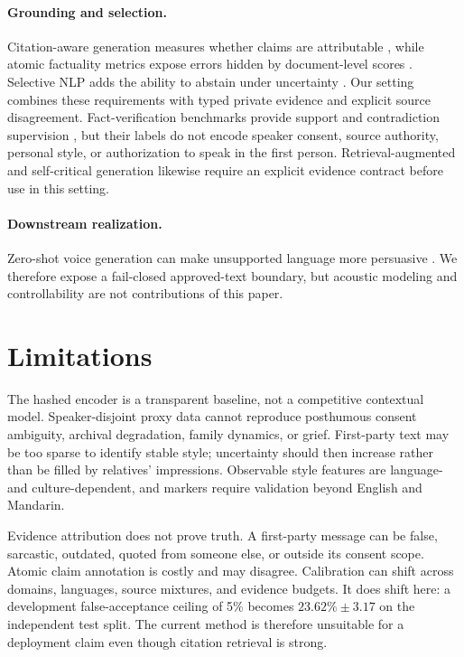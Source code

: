 \documentclass[11pt,a4paper]{article}
\begin{document}
\paragraph{Grounding and selection.}
Citation-aware generation measures whether claims are attributable
\citep{gao-etal-2023-enabling}, while atomic factuality metrics expose errors
hidden by document-level scores \citep{min-etal-2023-factscore}.  Selective NLP
adds the ability to abstain under uncertainty
\citep{xin-etal-2021-art,kamath-etal-2020-selective}.  Our setting combines these
  requirements with typed private evidence and explicit source disagreement.
  Fact-verification benchmarks provide support and contradiction supervision
  \citep{thorne2018fever,wadden2020fact}, but their labels do not encode speaker
  consent, source authority, personal style, or authorization to speak in the
  first person. Retrieval-augmented and self-critical generation
  \citep{lewis2020rag,asai2024selfrag,manakul2023selfcheckgpt} likewise require an
  explicit evidence contract before use in this setting.

\paragraph{Downstream realization.}
Zero-shot voice generation can make unsupported language more persuasive
\citep{chen-etal-2025-f5,peng-etal-2024-voicecraft}.  We therefore expose a
fail-closed approved-text boundary, but acoustic modeling and controllability
are not contributions of this paper.

\section{Limitations}

The hashed encoder is a transparent baseline, not a competitive contextual
model.  Speaker-disjoint proxy data cannot reproduce posthumous consent
ambiguity, archival degradation, family dynamics, or grief.  First-party text
may be too sparse to identify stable style; uncertainty should then increase
rather than be filled by relatives' impressions.  Observable style features
are language- and culture-dependent, and markers require validation beyond
English and Mandarin.

Evidence attribution does not prove truth.  A first-party message can be false,
sarcastic, outdated, quoted from someone else, or outside its consent scope.
Atomic claim annotation is costly and may disagree.  Calibration can shift
across domains, languages, source mixtures, and evidence budgets.  It does
shift here: a development false-acceptance ceiling of 5\% becomes
$23.62\%\pm3.17$ on the independent test split.  The current method is
therefore unsuitable for a deployment claim even though citation retrieval is
strong.
\end{document}
